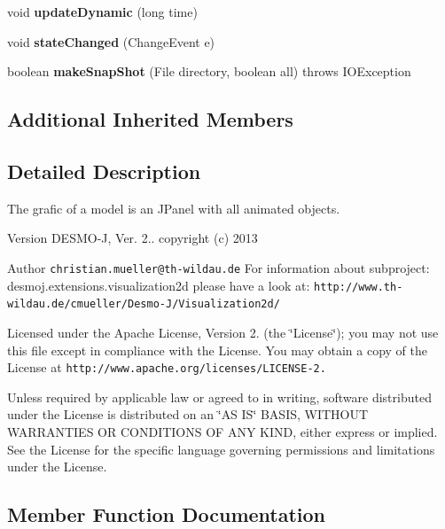 \begin{DoxyCompactItemize}
\item 
void {\bfseries update\-Dynamic} (long time)\label{classdesmoj_1_1extensions_1_1visualization2d_1_1engine_1_1model_grafic_1_1_model_grafic_ad085eea06ff587af056614fb2579d23f}

\item 
void {\bfseries state\-Changed} (Change\-Event e)\label{classdesmoj_1_1extensions_1_1visualization2d_1_1engine_1_1model_grafic_1_1_model_grafic_ad1dda9039e6d292b40ffc85062b8d0e4}

\item 
boolean {\bf make\-Snap\-Shot} (File directory, boolean all)  throws I\-O\-Exception
\end{DoxyCompactItemize}
\subsection*{Additional Inherited Members}


\subsection{Detailed Description}
The grafic of a model is an J\-Panel with all animated objects.

\begin{DoxyVersion}{Version}
D\-E\-S\-M\-O-\/\-J, Ver. 2.. copyright (c) 2013 
\end{DoxyVersion}
\begin{DoxyAuthor}{Author}
{\tt christian.\-mueller@th-\/wildau.\-de} For information about subproject\-: desmoj.\-extensions.\-visualization2d please have a look at\-: {\tt http\-://www.\-th-\/wildau.\-de/cmueller/\-Desmo-\/\-J/\-Visualization2d/}
\end{DoxyAuthor}
Licensed under the Apache License, Version 2. (the \char`\"{}\-License\char`\"{}); you may not use this file except in compliance with the License. You may obtain a copy of the License at {\tt http\-://www.\-apache.\-org/licenses/\-L\-I\-C\-E\-N\-S\-E-\/2.}

Unless required by applicable law or agreed to in writing, software distributed under the License is distributed on an \char`\"{}\-A\-S I\-S\char`\"{} B\-A\-S\-I\-S, W\-I\-T\-H\-O\-U\-T W\-A\-R\-R\-A\-N\-T\-I\-E\-S O\-R C\-O\-N\-D\-I\-T\-I\-O\-N\-S O\-F A\-N\-Y K\-I\-N\-D, either express or implied. See the License for the specific language governing permissions and limitations under the License. 

\subsection{Member Function Documentation}

